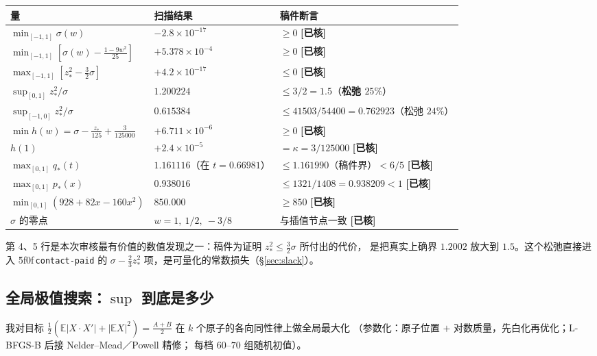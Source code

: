 \documentclass[UTF8,11pt]{ctexart}
\theoremstyle{definition}
\newcommand{\E}{\mathbb{E}}
\newcommand{\peq}[1]{\textup{\u5f0f}\,\texttt{#1}}
\newcommand{\chk}{\textcolor[rgb]{0.05,0.25,0.55}{\bfseries [已核]}}
\begin{document}
\begin{center}
\small
\begin{tabular}{lll}
\toprule
量 & 扫描结果 & 稿件断言\\
\midrule
$\min_{[-1,1]}\sigma(w)$ & $-2.8\times10^{-17}$ & $\ge0$ \chk\\
$\min_{[-1,1]}[\sigma(w)-\frac{1-9w^2}{25}]$ & $+5.378\times10^{-4}$ & $\ge0$ \chk\\
$\max_{[-1,1]}[z_*^2-\frac32\sigma]$ & $+4.2\times10^{-17}$ & $\le0$ \chk\\
$\sup_{[0,1]}z_*^2/\sigma$ & $1.200224$ & $\le3/2=1.5$（\textbf{松弛 $25\%$}）\\
$\sup_{[-1,0]}z_*^2/\sigma$ & $0.615384$ & $\le41503/54400=0.762923$（松弛 $24\%$）\\
$\min h(w)=\sigma-\frac{z_*}{125}+\frac3{125000}$ & $+6.711\times10^{-6}$ & $\ge0$ \chk\\
$h(1)$ & $+2.4\times10^{-5}$ & $=\kappa=3/125000$ \chk\\
$\max_{[0,1]}q_*(t)$ & $1.161116$（在 $t=0.66981$） & $\le1.161990$（稿件界）$<6/5$ \chk\\
$\max_{[0,1]}p_*(x)$ & $0.938016$ & $\le1321/1408=0.938209<1$ \chk\\
$\min_{[0,1]}(928+82x-160x^2)$ & $850.000$ & $\ge850$ \chk\\
$\sigma$ 的零点 & $w=1,\ 1/2,\ -3/8$ & 与插值节点一致 \chk\\
\bottomrule
\end{tabular}
\end{center}

\noindent 第 4、5 行是本次审核最有价值的数值发现之一：稿件为证明 $z_*^2\le\frac32\sigma$ 所付出的代价，
是把真实上确界 $1.2002$ 放大到 $1.5$。这个松弛直接进入 \peq{contact-paid} 的
$\sigma-\frac23z_*^2$ 项，是可量化的常数损失（\S\ref{sec:slack}）。

\subsection{全局极值搜索：$\sup$ 到底是多少}

我对目标 $\frac12(\E|X\cdot X'|+|\E X|^2)=\frac{A+B}2$ 在 $k$ 个原子的各向同性律上做全局最大化
（参数化：原子位置 $+$ 对数质量，先白化再优化；L-BFGS-B 后接 Nelder--Mead／Powell 精修；
每档 $60$--$70$ 组随机初值）。
\end{document}
